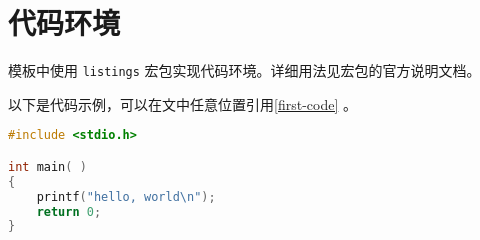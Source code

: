 \chapter{代码环境}
模板中使用 \texttt{listings} 宏包实现代码环境。详细用法见宏包的官方说明文档。

以下是代码示例，可以在文中任意位置引用\autoref{first-code} 。
\begin{lstlisting}[label=first-code, language=C, caption=示例代码]
#include <stdio.h>

int main( )
{
    printf("hello, world\n");
    return 0;
}
\end{lstlisting}
